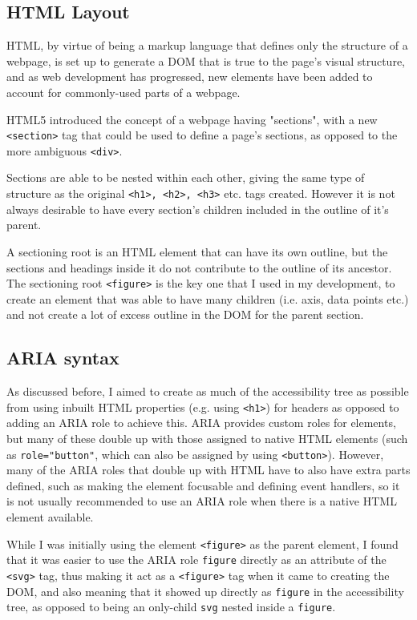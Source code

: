 \documentclass[ %
                    author={Aleena Baig},
                supervisor={Dr Simon Lock},
                    degree={BSc},
                     title={On Making Web Accessible Graphs},
                  subtitle={},
                      year={2019} ]{dissertation}
\begin{document}
\subsection{HTML Layout}

HTML, by virtue of being a markup language that defines only the structure of a webpage, is set up to generate a DOM that is true to the page's visual structure, and as web development has progressed, new elements have been added to account for commonly-used parts of a webpage.

HTML5 introduced the concept of a webpage having "sections", with a new \texttt{<section>} tag that could be used to define a page's sections, as opposed to the more ambiguous \texttt{<div>}.

Sections are able to be nested within each other, giving the same type of structure as the original \texttt{<h1>, <h2>, <h3>} etc. tags created. However it is not always desirable to have every section's children included in the outline of it's parent.

A sectioning root is an HTML element that can have its own outline, but the sections and headings inside it do not contribute to the outline of its ancestor. The sectioning root \texttt{<figure>} is the key one that I used in my development, to create an element that was able to have many children (i.e. axis, data points etc.) and not create a lot of excess outline in the DOM for the parent section.


\subsection{ARIA syntax}

As discussed before, I aimed to create as much of the accessibility tree as possible from using inbuilt HTML properties (e.g. using \texttt{<h1>}) for headers as opposed to adding an ARIA role to achieve this. ARIA provides custom roles for elements, but many of these double up with those assigned to native HTML elements (such as \texttt{role="button"}, which can also be assigned by using \texttt{<button>}). However, many of the ARIA roles that double up with HTML have to also have extra parts defined, such as making the element focusable and defining event handlers, so it is not usually recommended to use an ARIA role when there is a native HTML element available.

While I was initially using the element \texttt{<figure>} as the parent element, I found that it was easier to use the ARIA role \texttt{figure} directly as an attribute of the \texttt{<svg>} tag, thus making it act as a \texttt{<figure>} tag when it came to creating the DOM, and also meaning that it showed up directly as \texttt{figure} in the accessibility tree, as opposed to being an only-child \texttt{svg} nested inside a \texttt{figure}.
\end{document}

